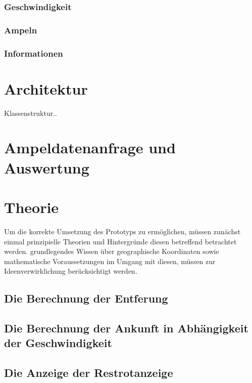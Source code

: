 \subsubsection{Geschwindigkeit}
\subsubsection{Ampeln}
\subsubsection{Informationen}
\section{Architektur}
Klassenstruktur..
\section{Ampeldatenanfrage und Auswertung}
\section{Theorie}
Um die korrekte Umsetzung des Prototyps zu ermöglichen, müssen zunächst einmal prinzipielle
Theorien und Hintergründe diesen betreffend betrachtet werden.
grundlegendes Wissen über geographische Koordinaten sowie mathematische Voraussetzungen im Umgang mit diesen, müssen zur Ideenverwirklichung berücksichtigt werden.
\subsection{Die Berechnung der Entferung}
\subsection{Die Berechnung der Ankunft in Abhängigkeit der Geschwindigkeit}
\subsection{Die Anzeige der Restrotanzeige}
